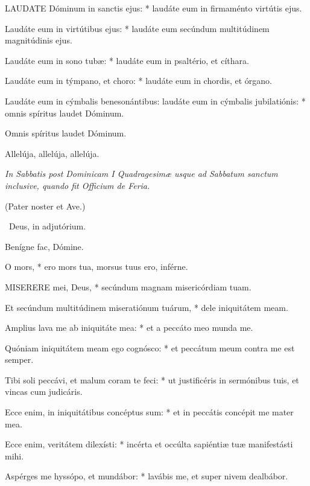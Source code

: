 \lettrine[lines=2]{L}{AUDATE} Dóminum in sanctis ejus: * laudáte eum in firmaménto virtútis ejus.

Laudáte eum in virtútibus ejus: * laudáte eum secúndum multitúdinem magnitúdinis ejus.

Laudáte eum in sono tubæ: * laudáte eum in psaltério, et cíthara.

Laudáte eum in týmpano, et choro: * laudáte eum in chordis, et órgano.

Laudáte eum in cýmbalis benesonántibus: laudáte eum in cýmbalis jubilatiónis: * omnis spíritus laudet Dóminum.


 Omnis spíritus laudet Dóminum.


 Allelúja, allelúja, allelúja.

\sectionornament


\textit{In Sabbatis post Dominicam I Quadragesimæ usque ad Sabbatum sanctum inclusive, quando fit Officium de Feria.}

(Pater noster et Ave.)

\V\ Deus, in adjutórium.

 Benígne fac, Dómine.


 O mors, * ero mors tua, morsus tuus ero, inférne.


\lettrine[lines=2]{M}{ISERERE} mei, Deus, * secúndum magnam misericórdiam tuam.

Et secúndum multitúdinem miseratiónum tuárum, * dele iniquitátem meam.

Amplius lava me ab iniquitáte mea: * et a peccáto meo munda me.

Quóniam iniquitátem meam ego cognósco: * et peccátum meum contra me est semper.

Tibi soli peccávi, et malum coram te feci: * ut justificéris in sermónibus tuis, et vincas cum judicáris.

Ecce enim, in iniquitátibus concéptus sum: * et in peccátis concépit me mater mea.

Ecce enim, veritátem dilexísti: * incérta et occúlta sapiéntiæ tuæ manifestásti mihi.

Aspérges me hyssópo, et mundábor: * lavábis me, et super nivem dealbábor.

